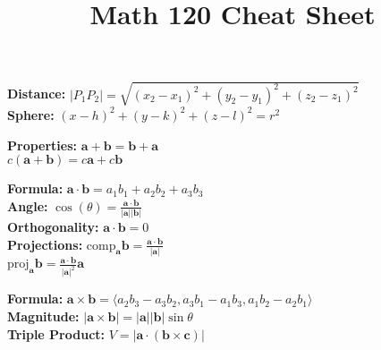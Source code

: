 \documentclass[2pt]{article}
\title{\small \textbf{Math 120 Cheat Sheet}} %
\date{} %
\begin{document}
\maketitle
\vspace{-10pt} %
\begin{multicols}{2}

\begin{tcolorbox}[title=\textbf{3D Coordinate Systems}, colframe=lightblue]
\textbf{Distance:} $|P_1P_2| = \sqrt{(x_2 - x_1)^2 + (y_2 - y_1)^2 + (z_2 - z_1)^2}$ \\
\textbf{Sphere:} $(x-h)^2 + (y-k)^2 + (z-l)^2 = r^2$
\end{tcolorbox}

\begin{tcolorbox}[title=\textbf{Vectors}, colframe=lightgreen]
\textbf{Properties:} $\mathbf{a} + \mathbf{b} = \mathbf{b} + \mathbf{a}$ \\
$c(\mathbf{a} + \mathbf{b}) = c\mathbf{a} + c\mathbf{b}$
\end{tcolorbox}

\begin{tcolorbox}[title=\textbf{Dot Product}, colframe=lightpink]
\textbf{Formula:} $\mathbf{a} \cdot \mathbf{b} = a_1b_1 + a_2b_2 + a_3b_3$ \\
\textbf{Angle:} $\cos(\theta) = \frac{\mathbf{a} \cdot \mathbf{b}}{|\mathbf{a}| |\mathbf{b}|}$ \\
\textbf{Orthogonality:} $\mathbf{a} \cdot \mathbf{b} = 0$ \\
\textbf{Projections:} $\text{comp}_{\mathbf{a}} \mathbf{b} = \frac{\mathbf{a} \cdot \mathbf{b}}{|\mathbf{a}|}$ \\
$\text{proj}_{\mathbf{a}} \mathbf{b} = \frac{\mathbf{a} \cdot \mathbf{b}}{|\mathbf{a}|^2} \mathbf{a}$
\end{tcolorbox}

\begin{tcolorbox}[title=\textbf{Cross Product}, colframe=lightyellow]
\textbf{Formula:} $\mathbf{a} \times \mathbf{b} = \langle a_2b_3 - a_3b_2, a_3b_1 - a_1b_3, a_1b_2 - a_2b_1 \rangle$ \\
\textbf{Magnitude:} $|\mathbf{a} \times \mathbf{b}| = |\mathbf{a}| |\mathbf{b}| \sin \theta$ \\
\textbf{Triple Product:} $V = |\mathbf{a} \cdot (\mathbf{b} \times \mathbf{c})|$
\end{tcolorbox}


\end{multicols}
\end{document}
